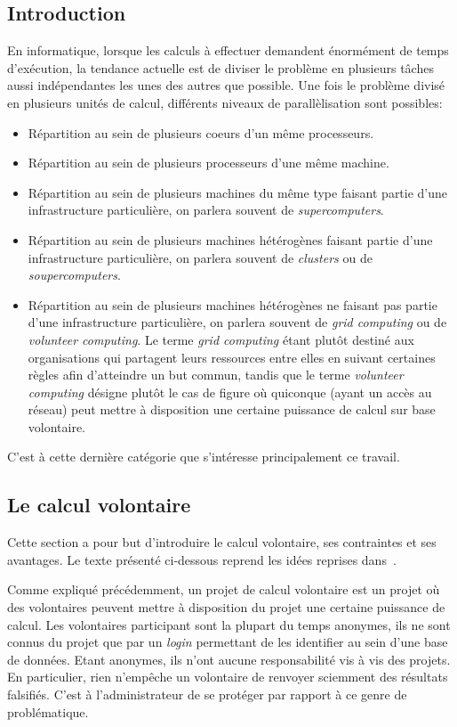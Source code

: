 \documentclass[a4paper, 11pt]{article}
\begin{document}
\subsection{Introduction}
En informatique, lorsque les calculs à effectuer demandent énormément de temps d'exécution, la tendance actuelle est de diviser le problème en plusieurs tâches aussi indépendantes les unes des autres que possible. Une fois le problème divisé en plusieurs unités de calcul, différents niveaux de parallèlisation sont possibles:
\begin{itemize}
\item Répartition au sein de plusieurs coeurs d'un même processeurs. %
\item Répartition au sein de plusieurs processeurs d'une même machine. %
\item Répartition au sein de plusieurs machines du même type faisant partie d'une infrastructure particulière, on parlera souvent de \textit{supercomputers}.
\item Répartition au sein de plusieurs machines hétérogènes faisant partie d'une infrastructure particulière, on parlera souvent de \textit{clusters} ou de \textit{soupercomputers}. %
\item Répartition au sein de plusieurs machines hétérogènes ne faisant pas partie d'une infrastructure particulière, on parlera souvent de \textit{grid computing} ou de \textit{volunteer computing}. Le terme \textit{grid computing} étant plutôt destiné aux organisations qui partagent leurs ressources entre elles en suivant certaines règles afin d'atteindre un but commun, tandis que le terme \textit{volunteer computing} désigne plutôt le cas de figure où quiconque (ayant un accès au réseau) peut mettre à disposition une certaine puissance de calcul sur base volontaire.
\end{itemize}
C'est à cette dernière catégorie que s'intéresse principalement ce travail. 

\subsection{Le calcul volontaire}
Cette section a pour but d'introduire le calcul volontaire, ses contraintes et ses avantages. Le texte présenté ci-dessous reprend les idées reprises dans~\cite{VOLUNTEER}.

Comme expliqué précédemment, un projet de calcul volontaire est un projet où des volontaires peuvent mettre à disposition du projet une certaine puissance de calcul. Les volontaires participant sont la plupart du temps anonymes, ils ne sont connus du projet que par un \textit{login} permettant de les identifier au sein d'une base de données. Etant anonymes, ils n'ont aucune responsabilité vis à vis des projets. En particulier, rien n'empêche un volontaire de renvoyer sciemment des résultats falsifiés. C'est à l'administrateur de se protéger par rapport à ce genre de problématique.
\end{document}
